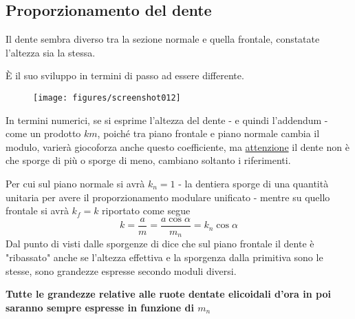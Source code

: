 \documentclass[a4paper, 15pt]{article}
\begin{document}
\subsection{Proporzionamento del dente}
\begin{adjustwidth}{2in}{}	
Il dente sembra diverso tra la sezione normale e quella frontale, constatate l'altezza sia la stessa. 

È il suo sviluppo in termini di passo ad essere differente. 
\begin{figure}[H]
	\centering
	\label{fig:screenshot012}
	\texttt{[image: figures/screenshot012]}
\end{figure}
In termini numerici, se si esprime l'altezza del dente - e quindi l'addendum - come un prodotto $km$, poiché tra piano frontale e piano normale cambia il modulo, varierà giocoforza anche questo coefficiente, ma \underline{attenzione} il dente non è che sporge di più o sporge di meno, cambiano soltanto i riferimenti. 

Per cui sul piano normale si avrà $k_n = 1$ - la dentiera sporge di una quantità unitaria per avere il proporzionamento modulare unificato - mentre su quello frontale si avrà $k_f = k$ riportato come segue 
\[k = \dfrac{a}{m} = \dfrac{a\cos\alpha}{m_n} = k_n\cos\alpha\]
Dal punto di visti dalle sporgenze di dice che sul piano frontale il dente è "ribassato" anche se  l'altezza effettiva e la sporgenza dalla primitiva sono le stesse, sono grandezze espresse secondo moduli diversi. \newline 

\textbf{Tutte le grandezze relative alle ruote dentate elicoidali d'ora in poi saranno sempre espresse in funzione di $m_n$} \newline 


\end{adjustwidth}
\end{document}
